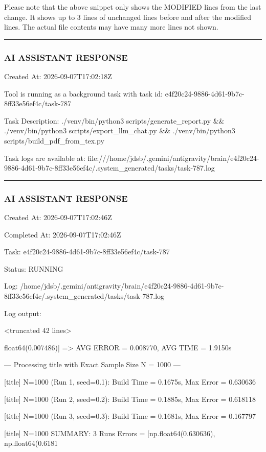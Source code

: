 \documentclass[11pt,a4paper]{article}
\begin{document}
Please note that the above snippet only shows the MODIFIED lines from the last change. It shows up to 3 lines of unchanged lines before and after the modified lines. The actual file contents may have many more lines not shown.


\hrule

\subsubsection{AI ASSISTANT RESPONSE}

Created At: 2026-09-07T17:02:18Z

Tool is running as a background task with task id: e4f20c24-9886-4d61-9b7c-8ff33e56ef4c/task-787

Task Description: ./venv/bin/python3 scripts/generate\_report.py \&\& ./venv/bin/python3 scripts/export\_llm\_chat.py \&\& ./venv/bin/python3 scripts/build\_pdf\_from\_tex.py

Task logs are available at: file:///home/jdsb/.gemini/antigravity/brain/e4f20c24-9886-4d61-9b7c-8ff33e56ef4c/.system\_generated/tasks/task-787.log


\hrule

\subsubsection{AI ASSISTANT RESPONSE}

Created At: 2026-09-07T17:02:46Z

Completed At: 2026-09-07T17:02:46Z

Task: e4f20c24-9886-4d61-9b7c-8ff33e56ef4c/task-787

Status: RUNNING

Log: /home/jdsb/.gemini/antigravity/brain/e4f20c24-9886-4d61-9b7c-8ff33e56ef4c/.system\_generated/tasks/task-787.log

Log output:

<truncated 42 lines>

float64(0.007486)] => AVG ERROR = 0.008770, AVG TIME = 1.9150s

--- Processing title with Exact Sample Size N = 1000 ---

[title] N=1000 (Run 1, seed=0.1): Build Time = 0.1675s, Max Error = 0.630636

[title] N=1000 (Run 2, seed=0.2): Build Time = 0.1885s, Max Error = 0.618118

[title] N=1000 (Run 3, seed=0.3): Build Time = 0.1681s, Max Error = 0.167797

[title] N=1000 SUMMARY: 3 Runs Errors = [np.float64(0.630636), np.float64(0.6181
\end{document}

